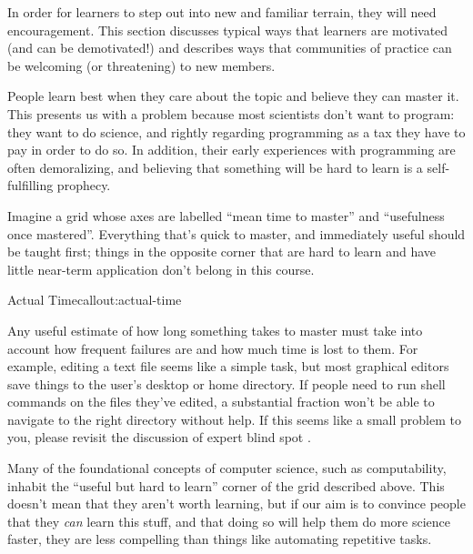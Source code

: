 
In order for learners to step out into new and familiar terrain, they
will need encouragement. This section discusses typical ways that
learners are motivated (and can be demotivated!) and describes ways that
communities of practice can be welcoming (or threatening) to new
members.


People learn best when they care about the topic and believe they can
master it. This presents us with a problem because most scientists don't
want to program: they want to do science, and rightly regarding
programming as a tax they have to pay in order to do so. In addition,
their early experiences with programming are often demoralizing, and
believing that something will be hard to learn is a self-fulfilling
prophecy.

Imagine a grid whose axes are labelled ``mean time to master'' and
``usefulness once mastered''. Everything that's quick to master, and
immediately useful should be taught first; things in the opposite corner
that are hard to learn and have little near-term application don't
belong in this course.


\begin{callout}{Actual Time}{callout:actual-time}

Any useful estimate of how long something takes to master must take into
account how frequent failures are and how much time is lost to them. For
example, editing a text file seems like a simple task, but most
graphical editors save things to the user's desktop or home directory.
If people need to run shell commands on the files they've edited, a
substantial fraction won't be able to navigate to the right directory
without help. If this seems like a small problem to you, please revisit
the discussion of expert blind spot .
\end{callout}

Many of the foundational concepts of computer science, such as
computability, inhabit the ``useful but hard to learn'' corner of the
grid described above. This doesn't mean that they aren't worth learning,
but if our aim is to convince people that they \emph{can} learn this
stuff, and that doing so will help them do more science faster, they are
less compelling than things like automating repetitive tasks.

